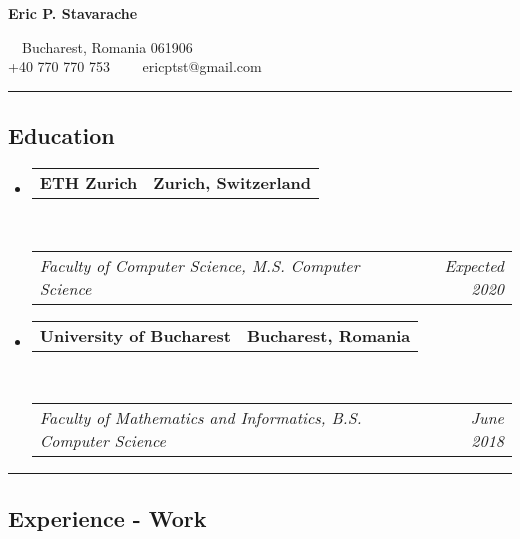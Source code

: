 \documentclass[10pt,letterpaper]{article}
\makeatletter
\newcommand{\headerrow}[2]
{\begin{tabular*}{\linewidth}{l@{\extracolsep{\fill}}r}
	#1 &
	#2 \\
\end{tabular*}}
\makeatother
\begin{document}
\begin{center}
{\LARGE \textbf{Eric P. Stavarache}}

\ \ Bucharest, Romania 061906
\\
+40 770 770 753\ \ \textbullet
\ \ ericptst@gmail.com
\end{center}

\hrule
\vspace{-1em}

\subsection*{Education}

\begin{itemize}
	\parskip=0.1em

	\item
	\headerrow
		{\textbf{ETH Zurich}}
		{\textbf{Zurich, Switzerland}}
	\\
	\headerrow
		{\emph{Faculty of Computer Science, M.S. Computer Science}}
		{\emph{Expected 2020}}

	\item
	\headerrow
		{\textbf{University of Bucharest}}
		{\textbf{Bucharest, Romania}}
	\\
	\headerrow
		{\emph{Faculty of Mathematics and Informatics, B.S. Computer Science}}
		{\emph{June 2018}}

\end{itemize}

\hrule
\vspace{-1em}
\subsection*{Experience - Work}
\end{document}

